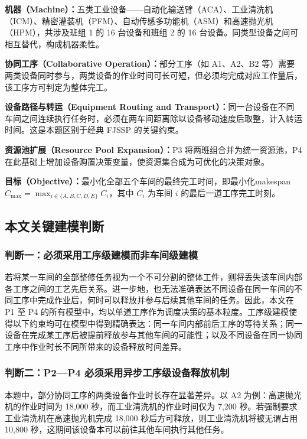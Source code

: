 \documentclass[UTF8,a4paper,12pt]{ctexart}
\begin{document}
\textbf{机器（Machine）：}五类工业设备——自动化输送臂（ACA）、工业清洗机（ICM）、精密灌装机（PFM）、自动传感多功能机（ASM）和高速抛光机（HPM），共涉及班组 1 的 16 台设备和班组 2 的 16 台设备。同类型设备之间可相互替代，构成机器柔性。

\textbf{协同工序（Collaborative Operation）：}部分工序（如 A1、A2、B2 等）需要两类设备同时参与，两类设备的作业时间可长可短，但必须均完成对应工作量后，该工序方可判定为整体完工。

\textbf{设备路径与转运（Equipment Routing and Transport）：}同一台设备在不同车间之间连续执行任务时，必须在两车间距离除以设备移动速度后取整，计入转运时间。这是本题区别于经典 FJSSP 的关键约束。

\textbf{资源池扩展（Resource Pool Expansion）：}P3 将两班组合并为统一资源池，P4 在此基础上增加设备购置决策变量，使资源集合成为可优化的决策对象。

\textbf{目标（Objective）：}最小化全部五个车间的最终完工时间，即最小化makespan $C_{\max} = \max_{i\in\{A,B,C,D,E\}} C_i$，其中 $C_i$ 为车间 $i$ 的最后一道工序完工时刻。

\subsection{本文关键建模判断}

\subsubsection{判断一：必须采用工序级建模而非车间级建模}
若将某一车间的全部整修任务视为一个不可分割的整体工件，则将丢失该车间内部各工序之间的工艺先后关系。进一步地，也无法准确表达不同设备在同一车间的不同工序中完成作业后，何时可以释放并参与后续其他车间的任务。因此，本文在 P1 至 P4 的所有模型中，均以单道工序作为调度决策的基本粒度。工序级建模使得以下约束均可在模型中得到精确表达：同一车间内部前后工序的等待关系；同一设备在完成某工序后被提前释放参与其他车间的可能性；以及不同设备在同一协同工序中作业时长不同所带来的设备释放时间差异。

\subsubsection{判断二：P2—P4 必须采用异步工序级设备释放机制}
本题中，部分协同工序的两类设备作业时长存在显著差异。以 A2 为例：高速抛光机的作业时间为 18,000 秒，而工业清洗机的作业时间仅为 7,200 秒。若强制要求工业清洗机在高速抛光机完成 18,000 秒后方可释放，则工业清洗机将被无谓占用 10,800 秒，这期间该设备本可以前往其他车间执行其他任务。
\end{document}
